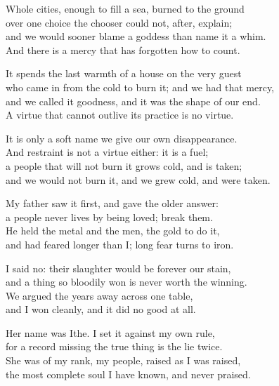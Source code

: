 \begin{founder}
Whole cities, enough to fill a sea, burned to the ground\\
over one choice the chooser could not, after, explain;\\
and we would sooner blame a goddess than name it a whim.\\
And there is a mercy that has forgotten how to count.\\
\medskip

It spends the last warmth of a house on the very guest\\
who came in from the cold to burn it; and we had that mercy,\\
and we called it goodness, and it was the shape of our end.\\
A virtue that cannot outlive its practice is no virtue.\\
\medskip

It is only a soft name we give our own disappearance.\\
And restraint is not a virtue either: it is a fuel;\\
a people that will not burn it grows cold, and is taken;\\
and we would not burn it, and we grew cold, and were taken.\\

\ornament

My father saw it first, and gave the older answer:\\
a people never lives by being loved; break them.\\
He held the metal and the men, the gold to do it,\\
and had feared longer than I; long fear turns to iron.\\
\medskip

I said no: their slaughter would be forever our stain,\\
and a thing so bloodily won is never worth the winning.\\
We argued the years away across one table,\\
and I won cleanly, and it did no good at all.\\
\medskip

Her name was Ithe. I set it against my own rule,\\
for a record missing the true thing is the lie twice.\\
She was of my rank, my people, raised as I was raised,\\
the most complete soul I have known, and never praised.\\
\medskip


\end{founder}
